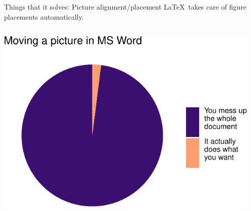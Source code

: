\documentclass[,aspectratio=43]{beamer}
\begin{document}
\begin{frame}{Things that it solves: Picture alignment/placement}
\protect\hypertarget{things-that-it-solves-picture-alignmentplacement}{}
\LaTeX~takes care of figure placements automatically.

\begin{columns}[T]
\begin{column}{0.64\textwidth}
\begin{center}\includegraphics[width=1\linewidth]{figure/piechart-1} \end{center}
\end{column}

\begin{column}{0.33\textwidth}
\vspace{2em}


\end{column}
\end{columns}
\end{frame}
\end{document}

